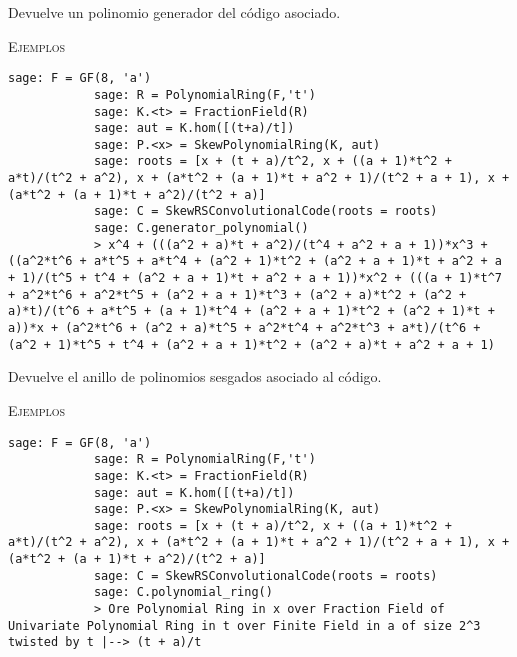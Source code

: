 \begin{description}[leftmargin=1em, font=\normalfont\ttfamily, style=nextline]
    \begin{description}[font=\ttfamily,style=nextline]
        \item[generator\_polynomial(self)] 
            Devuelve un polinomio generador del código asociado.

        \textsc{Ejemplos}

        \begin{lstlisting}[gobble=12]
            sage: F = GF(8, 'a')
            sage: R = PolynomialRing(F,'t')
            sage: K.<t> = FractionField(R)
            sage: aut = K.hom([(t+a)/t])
            sage: P.<x> = SkewPolynomialRing(K, aut)
            sage: roots = [x + (t + a)/t^2, x + ((a + 1)*t^2 + a*t)/(t^2 + a^2), x + (a*t^2 + (a + 1)*t + a^2 + 1)/(t^2 + a + 1), x + (a*t^2 + (a + 1)*t + a^2)/(t^2 + a)]
            sage: C = SkewRSConvolutionalCode(roots = roots) 
            sage: C.generator_polynomial()
            > x^4 + (((a^2 + a)*t + a^2)/(t^4 + a^2 + a + 1))*x^3 + ((a^2*t^6 + a*t^5 + a*t^4 + (a^2 + 1)*t^2 + (a^2 + a + 1)*t + a^2 + a + 1)/(t^5 + t^4 + (a^2 + a + 1)*t + a^2 + a + 1))*x^2 + (((a + 1)*t^7 + a^2*t^6 + a^2*t^5 + (a^2 + a + 1)*t^3 + (a^2 + a)*t^2 + (a^2 + a)*t)/(t^6 + a*t^5 + (a + 1)*t^4 + (a^2 + a + 1)*t^2 + (a^2 + 1)*t + a))*x + (a^2*t^6 + (a^2 + a)*t^5 + a^2*t^4 + a^2*t^3 + a*t)/(t^6 + (a^2 + 1)*t^5 + t^4 + (a^2 + a + 1)*t^2 + (a^2 + a)*t + a^2 + a + 1)
        \end{lstlisting}

    \end{description}

    \begin{description}[font=\ttfamily,style=nextline]
        \item[polynomial\_ring(self)] 
        Devuelve el anillo de polinomios sesgados asociado al código.

        \textsc{Ejemplos}

        \begin{lstlisting}[gobble=12]
            sage: F = GF(8, 'a')
            sage: R = PolynomialRing(F,'t')
            sage: K.<t> = FractionField(R)
            sage: aut = K.hom([(t+a)/t])
            sage: P.<x> = SkewPolynomialRing(K, aut)
            sage: roots = [x + (t + a)/t^2, x + ((a + 1)*t^2 + a*t)/(t^2 + a^2), x + (a*t^2 + (a + 1)*t + a^2 + 1)/(t^2 + a + 1), x + (a*t^2 + (a + 1)*t + a^2)/(t^2 + a)]
            sage: C = SkewRSConvolutionalCode(roots = roots) 
            sage: C.polynomial_ring()
            > Ore Polynomial Ring in x over Fraction Field of Univariate Polynomial Ring in t over Finite Field in a of size 2^3 twisted by t |--> (t + a)/t
        \end{lstlisting}        
    \end{description}


\end{description}
